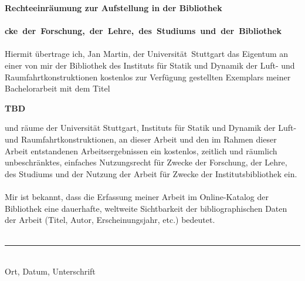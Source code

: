 
\begingroup
\large
\begin{sloppy}
	\textbf{\Large \textbf{Rechteeinräumung zur Aufstellung in der Bibliothek}}\\	
	\parskip 12pt \\
	\mbox{\textbf{cke der Forschung, der Lehre, des Studiums und der Bibliothek}}\\
	\parskip 12pt\\
	Hiermit übertrage ich, Jan Martin, der \mbox{Universität Stuttgart} das Eigentum an einer von mir der Bibliothek des Instituts für Statik und \mbox{Dynamik} der Luft- und Raumfahrtkonstruktionen kostenlos zur Verfügung\hspace{4pt} gestellten\hspace{3pt} Exemplars\hspace{3pt} meiner\hspace{3pt} Bachelorarbeit\hspace{3pt} mit\hspace{3pt} dem\hspace{3pt} Titel
	\begin{center}\textbf{TBD}\end{center}
	
	und räume der Universität Stuttgart, Instituts für Statik und Dynamik der Luft- und Raumfahrtkonstruktionen, an dieser Arbeit und den im Rahmen dieser Arbeit entstandenen Arbeitsergebnissen ein kostenlos, zeitlich und räumlich unbeschränktes, einfaches Nutzungsrecht für Zwecke der Forschung, der Lehre, des Studiums und der Nutzung der Arbeit für Zwecke der Institutsbibliothek ein.\\
	\parskip 12pt\\
	Mir ist bekannt, dass die Erfassung meiner Arbeit im Online-Katalog der Bibliothek eine dauerhafte, weltweite Sichtbarkeit der bibliographischen Daten der Arbeit (Titel, Autor, Erscheinungsjahr, etc.) bedeutet.\\
	\parskip  24pt\\
	
	\noindent\rule{6cm}{0.4pt}\\
	Ort, Datum, Unterschrift
	
\end{sloppy}	
	
\endgroup
\vspace*{\fill}


